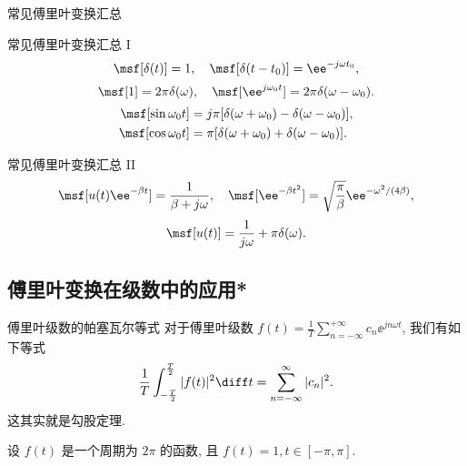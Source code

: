 \begin{frame}{常见傅里叶变换汇总}
	\onslide<+->
	\begin{algorithm}{常见傅里叶变换汇总 I}
	\[
		\msf[\delta(t)]=1,\quad \msf[\delta(t-t_0)]=\ee^{-j\omega t_0},
	\]
	\[
		\msf[1]=2\pi\delta(\omega),\quad \msf[\ee^{j\omega_0 t}]=2\pi\delta(\omega-\omega_0).
	\]
		\begin{align*}
		\msf[\sin \omega_0t]&=j\pi[\delta(\omega+\omega_0)-\delta(\omega-\omega_0)],\\
		\msf[\cos{\omega_0 t}]&=\pi[\delta(\omega+\omega_0)+\delta(\omega-\omega_0)].
		\end{align*}
	\end{algorithm}

	\onslide<+->
	\begin{main}{常见傅里叶变换汇总 II}
	\[
		\msf[u(t)\ee^{-\beta t}]=\dfrac1{\beta+j\omega},\quad
		\msf[\ee^{-\beta t^2}]=\sqrt{\dfrac\pi\beta}\ee^{-\omega^2/(4\beta)},
	\]
	\[
		\msf[u(t)]=\dfrac1{j\omega}+\pi\delta(\omega).
	\]
	\end{main}
\end{frame}


\subsection{傅里叶变换在级数中的应用*}
\begin{frame}{傅里叶级数的帕塞瓦尔等式\noexer}
	\onslide<+->
	对于傅里叶级数 $\displaystyle f(t)=\frac 1T\sum_{n=-\infty}^{+\infty}c_n \ee^{jn\omega t}$, 我们有如下等式
	\[\frac1{T}\int_{-\frac T2}^{\frac T2}|f(t)|^2\diff t=\sum_{n=-\infty}^{\infty}|c_n|^2.
	\]
	\onslide<+->
	这其实就是勾股定理.
	\onslide<+->
	\begin{example}
		设 $f(t)$ 是一个周期为 $2\pi$ 的函数, 且 $f(t)=1,t\in[-\pi,\pi]$.
		\vspace{-\baselineskip}
	\end{example}
\end{frame}


